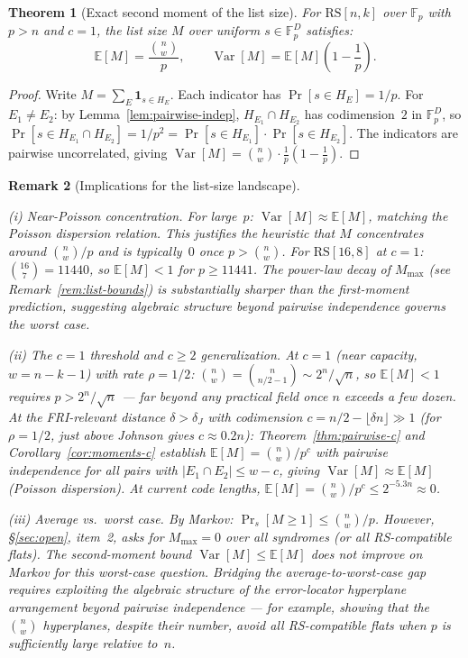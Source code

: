 \documentclass[11pt]{article}
\newtheorem{theorem}{Theorem}
\newtheorem{remark}[theorem]{Remark}
\newcommand{\FF}{\mathbb{F}}
\newcommand{\RS}{\mathrm{RS}}
\newcommand{\EE}{\mathbb{E}}
\DeclareMathOperator{\Var}{Var}
\begin{document}
\begin{theorem}[Exact second moment of the list size]
\label{thm:second-moment}
For $\RS[n,k]$ over $\FF_p$ with $p > n$ and $c = 1$, the list size $M$ over uniform $s \in \FF_p^D$ satisfies:
$$\EE[M] = \frac{\binom{n}{w}}{p}, \qquad \Var[M] = \EE[M]\!\left(1 - \frac{1}{p}\right).$$
\end{theorem}

\begin{proof}
Write $M = \sum_E \mathbf{1}_{s \in H_E}$. Each indicator has $\Pr[s \in H_E] = 1/p$. For $E_1 \neq E_2$: by Lemma~\ref{lem:pairwise-indep}, $H_{E_1} \cap H_{E_2}$ has codimension~$2$ in $\FF_p^D$, so $\Pr[s \in H_{E_1} \cap H_{E_2}] = 1/p^2 = \Pr[s \in H_{E_1}] \cdot \Pr[s \in H_{E_2}]$. The indicators are pairwise uncorrelated, giving $\Var[M] = \binom{n}{w} \cdot \tfrac{1}{p}(1 - \tfrac{1}{p})$.
\end{proof}

\begin{remark}[Implications for the list-size landscape]
\label{rem:poisson}
\hfill

\noindent\emph{(i) Near-Poisson concentration.} For large~$p$: $\Var[M] \approx \EE[M]$, matching the Poisson dispersion relation. This justifies the heuristic that $M$ concentrates around $\binom{n}{w}/p$ and is typically~$0$ once $p > \binom{n}{w}$. For $\RS[16,8]$ at $c = 1$: $\binom{16}{7} = 11440$, so $\EE[M] < 1$ for $p \geq 11441$. The power-law decay of $M_{\max}$ (see Remark~\ref{rem:list-bounds}) is substantially sharper than the first-moment prediction, suggesting algebraic structure beyond pairwise independence governs the worst case.

\noindent\emph{(ii) The $c = 1$ threshold and $c \geq 2$ generalization.} At $c = 1$ (near capacity, $w = n{-}k{-}1$) with rate $\rho = 1/2$: $\binom{n}{w} = \binom{n}{n/2-1} {\sim} 2^n/\sqrt{n}$, so $\EE[M] < 1$ requires $p > 2^n/\sqrt{n}$ --- far beyond any practical field once $n$ exceeds a few dozen. At the \emph{FRI-relevant} distance $\delta > \delta_J$ with codimension $c = n/2 - \lfloor\delta n\rfloor \gg 1$ (for $\rho = 1/2$, just above Johnson gives $c \approx 0.2n$): Theorem~\ref{thm:pairwise-c} and Corollary~\ref{cor:moments-c} establish $\EE[M] = \binom{n}{w}/p^c$ with pairwise independence for all pairs with $|E_1 \cap E_2| \leq w - c$, giving $\Var[M] \approx \EE[M]$ (Poisson dispersion). At current code lengths, $\EE[M] = \binom{n}{w}/p^c \leq 2^{-5.3n} \approx 0$.

\noindent\emph{(iii) Average vs.\ worst case.} By Markov: $\Pr_{s}[M \geq 1] \leq \binom{n}{w}/p$. However, \S\ref{sec:open}, item~2, asks for $M_{\max} = 0$ over \emph{all} syndromes (or all RS-compatible flats). The second-moment bound $\Var[M] \leq \EE[M]$ does not improve on Markov for this worst-case question. Bridging the average-to-worst-case gap requires exploiting the algebraic structure of the error-locator hyperplane arrangement beyond pairwise independence --- for example, showing that the $\binom{n}{w}$ hyperplanes, despite their number, avoid all RS-compatible flats when $p$ is sufficiently large relative to~$n$.
\end{remark}
\end{document}
